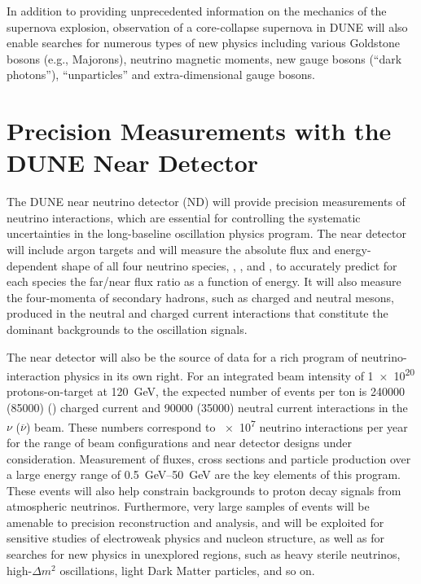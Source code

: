 In addition to providing unprecedented information on the mechanics of
the supernova explosion, observation of a core-collapse supernova in
DUNE will also enable searches for numerous types of new physics
including various Goldstone bosons (e.g., Majorons), neutrino magnetic
moments, new gauge bosons (``dark photons''), ``unparticles'' and
extra-dimensional gauge bosons.

%
%
\section{Precision Measurements with the DUNE Near Detector}

The DUNE near neutrino detector (ND) will provide precision measurements of
neutrino interactions, which are essential
for controlling the systematic uncertainties in the long-baseline
oscillation physics program.  The near detector %
will include argon targets and will measure the absolute flux and energy-dependent
shape of all four neutrino species, \numu, \anumu, \nue and \anue,
to accurately predict for each species the
far/near flux ratio as a function of energy.  It will also measure the
four-momenta of secondary hadrons, such as charged and neutral mesons,
produced in the neutral and charged current interactions that
constitute the dominant backgrounds to the oscillation signals.

The near detector will also be the source of data for a rich program of neutrino-interaction 
physics in its own right. For an integrated beam intensity of 
\num{1e20} %
protons-on-target at \SI{120}{GeV}, the expected number
of events per ton is 
 \num{240000} (\num{85000}) %
\numu (\anumu) charged current 
and \num{90000} (\num{35000})  neutral current interactions in the $\nu$ ($\overline\nu$) beam. These numbers correspond to
\num{e7}  neutrino interactions per year for the range of beam
configurations and near detector designs under consideration.
Measurement of fluxes, cross sections and particle production over a
large energy range of \SIrange{0.5}{50}{\GeV} are the key
elements of this program.  These events
will also help constrain backgrounds to proton decay signals from atmospheric neutrinos.
Furthermore, very large
samples of events will be amenable to precision reconstruction and
analysis, and will be exploited for sensitive studies of electroweak
physics and nucleon structure, as well as for searches for new physics
in unexplored regions, such as heavy sterile neutrinos, high-$\Delta m^2$
oscillations, light Dark Matter particles, and so on. 

